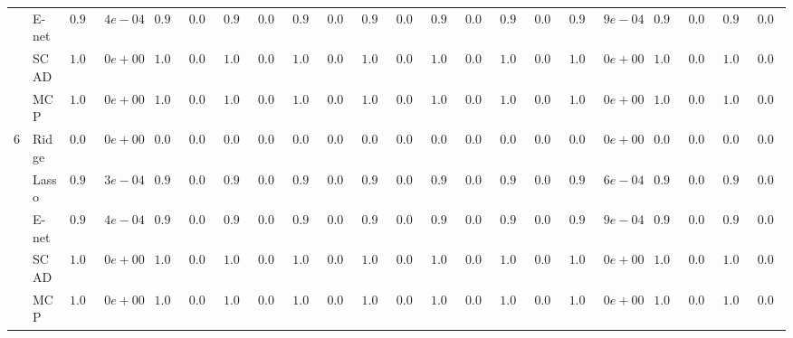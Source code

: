 \begin{tabular}{ll|ll|llllll|llllll|llllll}
 & E-net  & $0.9998$ & $4e-04$ & $0.9985$ & $0.0017$ & $0.9963$ & $0.0022$ & $0.9962$ & $0.0024$ & $0.9995$ & $0.0011$ & $0.9991$ & $0.0016$ & $0.9867$ & $0.0052$ & $0.9996$ & $9e-04$ & $0.9985$ & $0.0016$ & $0.9938$ & $0.0027$ \\
 & SCAD  & $1.0000$ & $0e+00$ & $1.0000$ & $0.0000$ & $1.0000$ & $0.0000$ & $1.0000$ & $0.0000$ & $1.0000$ & $0.0001$ & $1.0000$ & $0.0000$ & $1.0000$ & $0.0000$ & $1.0000$ & $0e+00$ & $1.0000$ & $0.0000$ & $1.0000$ & $0.0000$ \\
 & MCP  & $1.0000$ & $0e+00$ & $1.0000$ & $0.0000$ & $1.0000$ & $0.0000$ & $1.0000$ & $0.0000$ & $1.0000$ & $0.0001$ & $1.0000$ & $0.0000$ & $1.0000$ & $0.0000$ & $1.0000$ & $0e+00$ & $1.0000$ & $0.0000$ & $1.0000$ & $0.0000$ \\\hline
6 & Ridge  & $0.0000$ & $0e+00$ & $0.0000$ & $0.0000$ & $0.0000$ & $0.0000$ & $0.0000$ & $0.0000$ & $0.0000$ & $0.0000$ & $0.0000$ & $0.0000$ & $0.0000$ & $0.0000$ & $0.0000$ & $0e+00$ & $0.0000$ & $0.0000$ & $0.0000$ & $0.0000$ \\
 & Lasso  & $0.9999$ & $3e-04$ & $0.9991$ & $0.0013$ & $0.9977$ & $0.0018$ & $0.9974$ & $0.0020$ & $0.9997$ & $0.0009$ & $0.9995$ & $0.0011$ & $0.9890$ & $0.0048$ & $0.9998$ & $6e-04$ & $0.9991$ & $0.0012$ & $0.9949$ & $0.0024$ \\
 & E-net  & $0.9998$ & $4e-04$ & $0.9985$ & $0.0017$ & $0.9963$ & $0.0022$ & $0.9962$ & $0.0024$ & $0.9996$ & $0.0010$ & $0.9991$ & $0.0016$ & $0.9867$ & $0.0052$ & $0.9996$ & $9e-04$ & $0.9985$ & $0.0016$ & $0.9938$ & $0.0027$ \\
 & SCAD  & $1.0000$ & $0e+00$ & $1.0000$ & $0.0000$ & $1.0000$ & $0.0000$ & $1.0000$ & $0.0000$ & $1.0000$ & $0.0001$ & $1.0000$ & $0.0000$ & $1.0000$ & $0.0000$ & $1.0000$ & $0e+00$ & $1.0000$ & $0.0000$ & $1.0000$ & $0.0000$ \\
 & MCP  & $1.0000$ & $0e+00$ & $1.0000$ & $0.0000$ & $1.0000$ & $0.0000$ & $1.0000$ & $0.0000$ & $1.0000$ & $0.0001$ & $1.0000$ & $0.0000$ & $1.0000$ & $0.0000$ & $1.0000$ & $0e+00$ & $1.0000$ & $0.0000$ & $1.0000$ & $0.0000$ \\
\hline 
\end{tabular}

